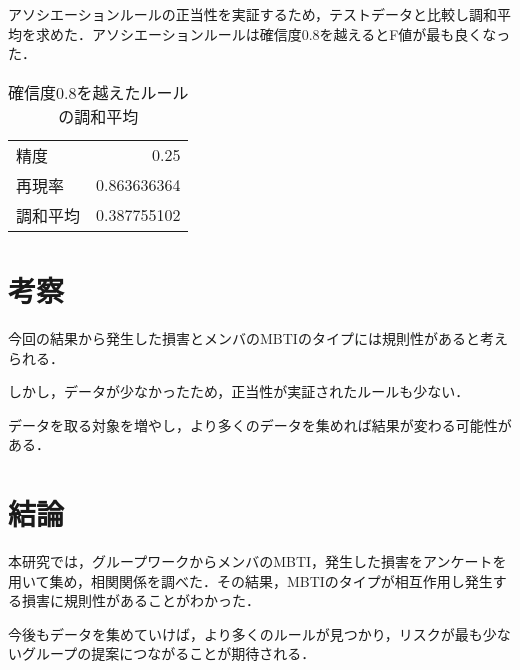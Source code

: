 \documentclass[uplatex,twocolumn,dvipdfmx]{jsarticle}
\begin{document}
アソシエーションルールの正当性を実証するため，テストデータと比較し調和平均を求めた．アソシエーションルールは確信度0.8を越えるとF値が最も良くなった．

\renewcommand{\arraystretch}{0.75}
\begin{table}[htbp]
\centering
\caption{確信度0.8を越えたルールの調和平均}\label{調和平均算出結果}
\begin{tabular}{l|r}
\hline
精度 & 0.25\\
再現率 & 0.863636364\\
調和平均 & 0.387755102\\
\hline
\end{tabular}
\end{table}
\renewcommand{\arraystretch}{0.75}


\section{考察}
今回の結果から発生した損害とメンバのMBTIのタイプには規則性があると考えられる．

しかし，データが少なかったため，正当性が実証されたルールも少ない．

データを取る対象を増やし，より多くのデータを集めれば結果が変わる可能性がある．

\section{結論}
本研究では，グループワークからメンバのMBTI，発生した損害をアンケートを用いて集め，相関関係を調べた．その結果，MBTIのタイプが相互作用し発生する損害に規則性があることがわかった．

今後もデータを集めていけば，より多くのルールが見つかり，リスクが最も少ないグループの提案につながることが期待される．
\nocite{MBTI}
\nocite{110009915588}

\end{document}
